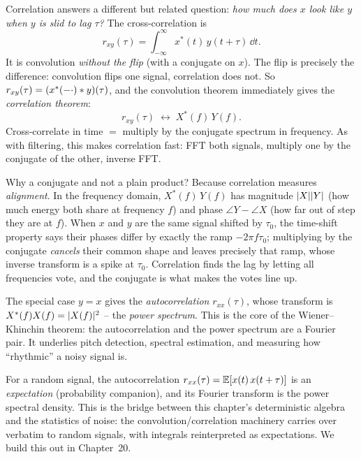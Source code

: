 Correlation answers a different but related question: \emph{how much does $x$ look
like $y$ when $y$ is slid to lag $\tau$?} The cross-correlation is
\[
r_{xy}(\tau) = \int_{-\infty}^{\infty} x^{*}(t)\, y(t + \tau)\, \dd t.
\]
It is convolution \emph{without the flip} (with a conjugate on $x$). The flip is
precisely the difference: convolution flips one signal, correlation does not. So
$r_{xy}(\tau) = (x^{*}(-\cdot) \ast y)(\tau)$, and the convolution theorem
immediately gives the \emph{correlation theorem}:
\[
r_{xy}(\tau) \;\longleftrightarrow\; X^{*}(f)\,Y(f).
\]
Cross-correlate in time $=$ multiply by the conjugate spectrum in frequency. As
with filtering, this makes correlation fast: FFT both signals, multiply one by
the conjugate of the other, inverse FFT.

\begin{intuitionbox}
Why a conjugate and not a plain product? Because correlation measures
\emph{alignment}. In the frequency domain, $X^{*}(f)\,Y(f)$ has magnitude
$\lvert X\rvert\lvert Y\rvert$ (how much energy both share at frequency $f$) and phase
$\angle Y - \angle X$ (how far out of step they are at $f$). When $x$ and $y$ are
the same signal shifted by $\tau_0$, the time-shift property says their phases
differ by exactly the ramp $-2\pi f \tau_0$; multiplying by the conjugate
\emph{cancels} their common shape and leaves precisely that ramp, whose inverse
transform is a spike at $\tau_0$. Correlation finds the lag by letting all
frequencies vote, and the conjugate is what makes the votes line up.
\end{intuitionbox}

The special case $y = x$ gives the \emph{autocorrelation} $r_{xx}(\tau)$, whose
transform is $X^{*}(f)X(f) = \lvert X(f)\rvert^2$ -- the \emph{power spectrum}. This is
the core of the Wiener--Khinchin theorem: the autocorrelation and the power
spectrum are a Fourier pair. It underlies pitch detection, spectral
estimation, and measuring how ``rhythmic'' a noisy signal is.

\begin{connectionbox}
For a random signal, the autocorrelation $r_{xx}(\tau) = \operatorname{\mathbb{E}}[x(t)\,x(t+\tau)]$ is
an \emph{expectation} (probability companion), and its Fourier transform is the
power spectral density. This is the bridge between this chapter's deterministic
algebra and the statistics of noise: the convolution/correlation machinery
carries over verbatim to random signals, with integrals reinterpreted as
expectations. We build this out in Chapter~20.
\end{connectionbox}

